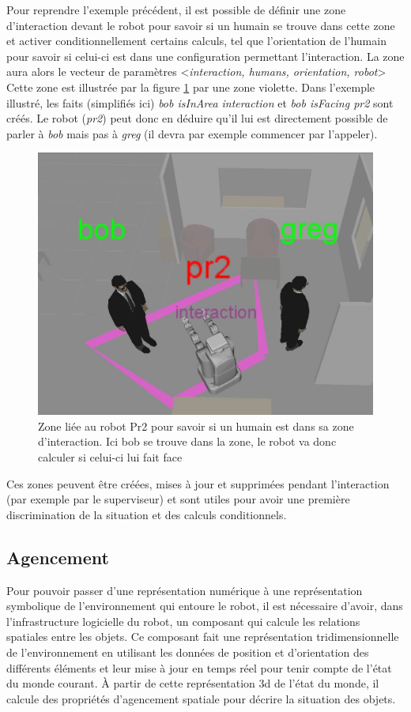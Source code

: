 \documentclass[a4paper,11pt,twoside]{StyleThese}
\begin{document}
Pour reprendre l'exemple précédent, il est possible de définir une zone d'interaction devant le robot pour savoir si un humain se trouve dans cette zone et activer conditionnellement certains calculs, tel que l'orientation de l'humain pour savoir si celui-ci est dans une configuration permettant l'interaction.
La zone aura alors le vecteur de paramètres <\textit{interaction, humans, orientation, robot}>
Cette zone est illustrée par la figure \ref{fig:interaction} par une zone violette.
Dans l'exemple illustré, les faits (simplifiés ici) \textit{bob isInArea interaction} et \textit{bob isFacing pr2} sont créés. Le robot (\textit{pr2}) peut donc en déduire qu'il lui est directement possible de parler à \textit{bob} mais pas à \textit{greg} (il devra par exemple commencer par l'appeler).


\begin{figure}[ht!]
 \centering
  \includegraphics[width=0.69\linewidth]{./img/interactionarea.jpg} 
  \caption {Zone liée au robot Pr2 pour savoir si un humain est dans sa zone d'interaction. Ici bob se trouve dans la zone, le robot va donc calculer si celui-ci lui fait face}
  \label{fig:interaction}
\end{figure}

Ces zones peuvent être créées, mises à jour et supprimées pendant l'interaction (par exemple par le superviseur) et sont utiles pour avoir une première discrimination de la situation et des calculs conditionnels.


\subsection{Agencement}
\label{sec:agencement}
Pour pouvoir passer d'une représentation numérique à une représentation symbolique de l'environnement qui entoure le robot, il est nécessaire d'avoir, dans l'infrastructure logicielle du robot, un composant qui calcule les relations spatiales entre les objets. Ce composant fait une représentation tridimensionnelle de l'environnement en utilisant les données de position et d'orientation des différents éléments et leur mise à jour en temps réel pour tenir compte de l'état du monde courant. À partir de cette représentation 3d de l'état du monde, il calcule des propriétés d'agencement spatiale pour décrire la situation des objets.
\end{document}
